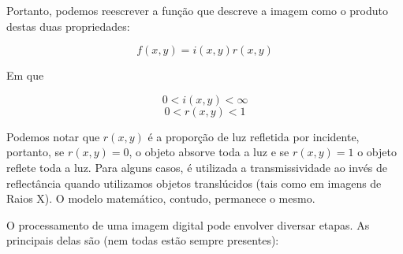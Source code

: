 \documentclass[10pt,a4paper]{article}
\begin{document}
Portanto, podemos reescrever a função que descreve a imagem como o produto destas duas propriedades:

\[ f(x,y) = i(x,y) r(x,y) \]

Em que

\[ 0 < i(x,y) < \infty \]
\[ 0 < r(x,y) < 1 \]

Podemos notar que $r(x,y)$ é a proporção de luz refletida por incidente, portanto, se $r(x,y) = 0$, o objeto absorve toda a luz e se $r(x,y) = 1$ o objeto reflete toda a luz. Para alguns casos, é utilizada a transmissividade ao invés de reflectância quando utilizamos objetos translúcidos (tais como em imagens de Raios X). O modelo matemático, contudo, permanece o mesmo.

O processamento de uma imagem digital pode envolver diversar etapas. As principais delas são (nem todas estão sempre presentes)\cite{livro}:
\end{document}
